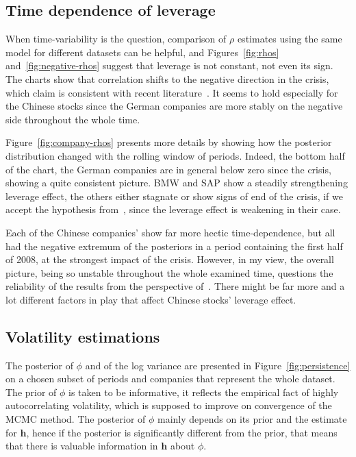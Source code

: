 \subsection{Time dependence of leverage}

When time-variability is the question, comparison of $\rho$ estimates using the same model for different datasets can be helpful, and Figures~\ref{fig:rhos} and~\ref{fig:negative-rhos} suggest that leverage is not constant, not even its sign.
The charts show that correlation shifts to the negative direction in the crisis, which claim is consistent with recent literature~\citep{Christensen2015}.
It seems to hold especially for the Chinese stocks since the German companies are more stably on the negative side throughout the whole time.

Figure~\ref{fig:company-rhos} presents more details by showing how the posterior distribution changed with the rolling window of periods.
Indeed, the bottom half of the chart, the German companies are in general below zero since the crisis, showing a quite consistent picture.
BMW and SAP show a steadily strengthening leverage effect, the others either stagnate or show signs of end of the crisis, if we accept the hypothesis from~\citet{Christensen2015}, since the leverage effect is weakening in their case.

Each of the Chinese companies' show far more hectic time-dependence, but all had the negative extremum of the posteriors in a period containing the first half of 2008, at the strongest impact of the crisis.
However, in my view, the overall picture, being so unstable throughout the whole examined time, questions the reliability of the results from the perspective of~\citet{Christensen2015}.
There might be far more and a lot different factors in play that affect Chinese stocks' leverage effect.

\subsection{Volatility estimations}

The posterior of $\phi$ and of the log variance are presented in Figure~\ref{fig:persistence} on a chosen subset of periods and companies that represent the whole dataset.
The prior of $\phi$ is taken to be informative, it reflects the empirical fact of highly autocorrelating volatility, which is supposed to improve on convergence of the MCMC method.
The posterior of $\phi$ mainly depends on its prior and the estimate for $\bm h$, hence if the posterior is significantly different from the prior, that means that there is valuable information in $\bm h$ about $\phi$.

